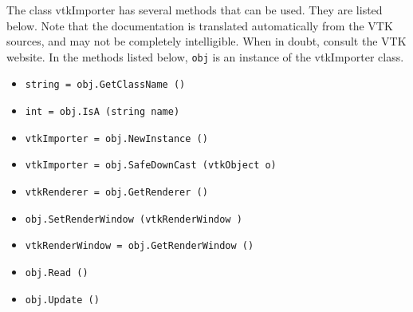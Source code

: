 The class vtkImporter has several methods that can be used.
  They are listed below.
Note that the documentation is translated automatically from the VTK sources,
and may not be completely intelligible.  When in doubt, consult the VTK website.
In the methods listed below, \verb|obj| is an instance of the vtkImporter class.
\begin{itemize}
\item  \verb|string = obj.GetClassName ()|

\item  \verb|int = obj.IsA (string name)|

\item  \verb|vtkImporter = obj.NewInstance ()|

\item  \verb|vtkImporter = obj.SafeDownCast (vtkObject o)|

\item  \verb|vtkRenderer = obj.GetRenderer ()|

\item  \verb|obj.SetRenderWindow (vtkRenderWindow )|

\item  \verb|vtkRenderWindow = obj.GetRenderWindow ()|

\item  \verb|obj.Read ()|

\item  \verb|obj.Update ()|

\end{itemize}
